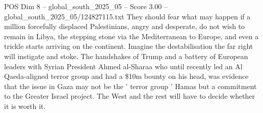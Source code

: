 \begin{textsample}{POS Dim 8 – global\_south\_2025\_05 – Score 3.00 – global\_south\_2025\_05/124827115.txt}
They should fear what may happen if a million forcefully displaced Palestinians, angry and desperate, do not wish to remain in Libya, the stepping stone via the Mediterranean to Europe, and even a trickle starts arriving on the continent.
Imagine the destabilisation the far right will instigate and stoke.
The handshakes of Trump and a battery of European leaders with Syrian President Ahmed al-Sharaa who until recently led an Al Qaeda-aligned terror group and had a \$10m bounty on his head, was evidence that the issue in Gaza may not be the ' terror group ' Hamas but a commitment to the Greater Israel project.
The West and the rest will have to decide whether it is worth it.

\end{textsample}

